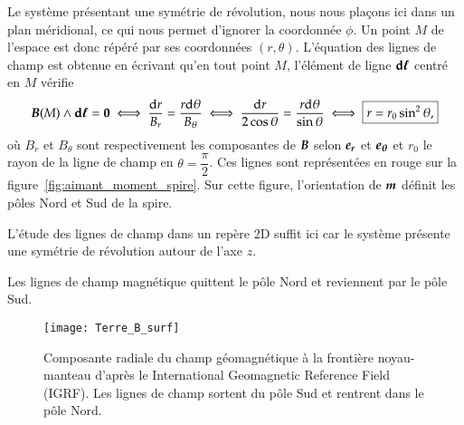 	Le système présentant
	une symétrie de révolution, nous nous plaçons ici dans un plan méridional,
	ce qui nous permet d'ignorer la coordonnée $\phi$. Un point
	$M$ de l'espace est donc répéré par ses coordonnées $(r, \theta)$. L'équation des
	lignes de champ est obtenue en écrivant qu'en tout point $M$, l'élément 
	de ligne $\dl$ centré en $M$ vérifie
	\begin{equation*}
		\vecb(M) \wedge \dl = \mitbf{0} \iff \dfrac{\dr}{B_r} = 
		\dfrac{r\dtheta}{B_\theta} \iff \dfrac{\dr}{2\cos\theta} =
		\dfrac{r \dtheta}{\sin \theta} \iff \boxed{r = r_0 \sin^2 \theta,}
	\end{equation*}
	où $B_r$ et $B_\theta$ sont respectivement les composantes de $\vecb$ selon
	$\er$ et $\etheta$ et $r_0$ le rayon de la ligne de champ en $\theta = 
	\dfrac{\pi}{2}$. Ces lignes sont représentées en rouge sur la 
	figure~\ref{fig:aimant_moment_spire}. Sur cette figure, l'orientation
	de $\vecm$ définit les pôles Nord et Sud de la spire.
	
	\begin{rema}
	L'étude des lignes
	de champ dans un repère 2D suffit ici car le système présente une symétrie de
	révolution autour de l'axe $z$. 
	\end{rema}

	\begin{defn}
		Les lignes de champ magnétique quittent le pôle Nord et 
		reviennent par le pôle Sud.
	\end{defn}
	
	\begin{figure}[b]
		\centering
		\texttt{[image: Terre\_B\_surf]}
		\caption{Composante radiale du champ géomagnétique à la frontière
		noyau-manteau d'après le International Geomagnetic Reference Field
		(IGRF). Les lignes de champ sortent du pôle Sud et rentrent
		dans le pôle Nord.}%
		\label{fig:Terre_surf}
	\end{figure}

